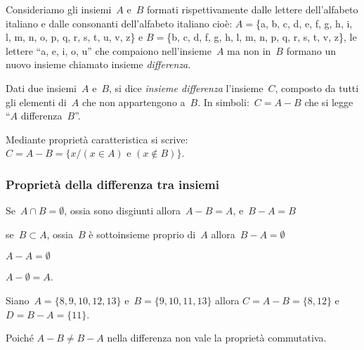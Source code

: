 Consideriamo gli insiemi~\(A\) e~\(B\) formati rispettivamente
dalle lettere dell'alfabeto italiano e dalle
consonanti dell'alfabeto italiano cioè:
\(A=\)\{a, b, c, d, e, f, g, h, i, l, m, n, o, p, q, r, s, t, u, v, z\} e
\(B=\)\{b, c, d, f, g, h, l, m, n, p, q, r, s, t, v, z\}, le lettere 
``a, e, i, o, u'' che compaiono nell'insieme~\(A\) ma non in~\(B\) formano 
un 
nuovo insieme chiamato insieme \emph{differenza}.

\begin{definizione}
 Dati due insiemi~\(A\) e~\(B\), si dice \emph{insieme differenza} 
 l'insieme~\(C\), 
 composto da tutti gli elementi di~\(A\) che non appartengono a~\(B\). 
 In simboli:~\(C=A-B\) che si legge ``\(A\) differenza~\(B\)''.
\end{definizione}

\begin{center}

\end{center}
Mediante proprietà caratteristica si 
scrive:~\(C=A-B=\{x/(x\in A)\text{ e }(x\notin B)\}\).

\subsubsection{Proprietà della differenza tra insiemi}

\begin{enumeratea}
\item Se~\(A\cap B=\emptyset \), ossia sono disgiunti 
allora~\(A-B=A\), e~\(B-A=B\)
\item se~\(B\subset A\), ossia~\(B\) è sottoinsieme proprio 
 di~\(A\) allora~\(B-A=\emptyset \)
\item \(A-A=\emptyset\)
\item \(A-\emptyset =A\).
\end{enumeratea}

\begin{exrig}
 \begin{esempio}
Siano~\(A=\{8, 9, 10, 12, 13\}\) e~\(B=\{9, 10, 11, 13\}\) allora
\(C=A-B=\{8, 12\}\) e~\(D=B-A=\{11\}\).
\begin{center}
 
\end{center}
 \end{esempio}
\end{exrig}

Poiché \(A-B\neq B-A\) nella differenza non vale la proprietà
commutativa.


